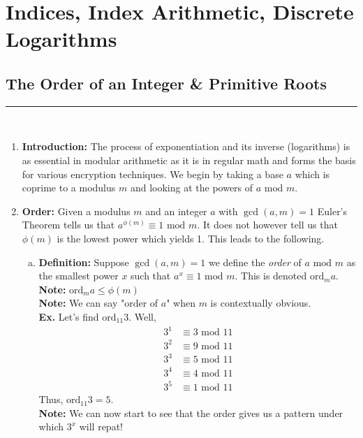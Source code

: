 \documentclass[class=article, crop=false]{standalone}
\begin{document}
    
\section{Indices, Index Arithmetic, Discrete Logarithms}
\subsection{The Order of an Integer \& Primitive Roots}
\rule{\textwidth}{1pt}\\
\begin{enumerate}
\item \textbf{Introduction:} 
The process of exponentiation and its inverse (logarithms) is as essential in modular arithmetic as it 
is in regular math and forms the basis for various encryption techniques. We begin by taking a base $a$
which is coprime to a modulus $m$ and looking at the powers of $a\mbox{ mod }m$.

\item \textbf{Order:}
Given a modulus $m$ and an integer $a$ with $\gcd(a,m)=1$ Euler's Theorem tells us that
$a^{\phi(m)} \equiv 1\mbox{ mod }m$. It does not however tell us that $\phi(m)$ is the lowest
power which yields 1. This leads to the following.
\begin{enumerate}[(a)]
	\item \textbf{Definition:} Suppose $\gcd(a,m)=1$ we define the \emph{order} of $a\mbox{ mod }m$
	as the smallest power $x$ such that $a^x \equiv 1\mbox{ mod }m$. This is denoted $\mbox{ord}_m a$. \\
	\textbf{Note:} $\mbox{ord}_m a \leq \phi(m)$ \\
	\textbf{Note:} We can say "order of $a$" when $m$ is contextually obvious.\\
	\textbf{Ex.} Let's find $\mbox{ord}_{11} 3$. Well,
	\begin{align*}
		3^1 &\equiv 3\mbox{ mod }11 \\
		3^2 &\equiv 9\mbox{ mod }11 \\
		3^3 &\equiv 5\mbox{ mod }11 \\
		3^4 &\equiv 4\mbox{ mod }11 \\
		3^5 &\equiv 1\mbox{ mod }11
	\end{align*}
	Thus, $\mbox{ord}_{11} 3 = 5$. \\
	\textbf{Note:} We can now start to see that the order gives us a pattern under which
	$3^x$ will repat!
	

\end{enumerate}
\end{enumerate}
\end{document}
